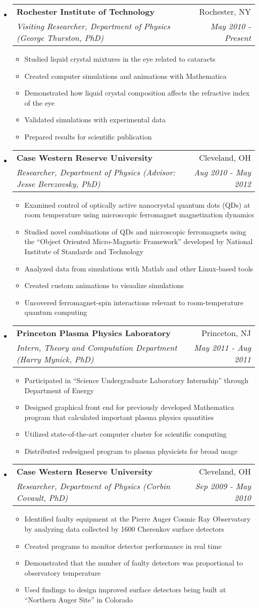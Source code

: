 \documentclass[letterpaper,11pt]{article}
\makeatletter
\newcommand{\resitem}[1]{\item #1 \vspace{-2pt}}
\newcommand{\ressubheading}[4]{\vspace{-14pt}
\begin{tabular*}{7.0in}{l@{\extracolsep{\fill}}r}
		\\
		\textbf{#1} & #2 \\
		\textit{#3} & \textit{#4} \\
\end{tabular*}\vspace{-6pt}}
\makeatother
\begin{document}
\begin{itemize}

\item
	\ressubheading{Rochester Institute of Technology}{Rochester, NY}{Visiting Researcher, Department of Physics (George Thurston, PhD)}{May 2010 - Present}
	\begin{itemize}
		\resitem{Studied liquid crystal mixtures in the eye related to cataracts}
		\resitem{Created computer simulations and animations with Mathematica}
		\resitem{Demonstrated how liquid crystal composition affects the refractive index of the eye}
	 	\resitem{Validated simulations with experimental data}
	 	\resitem{Prepared results for scientific publication}
	\end{itemize}	
	
\item
	\ressubheading{Case Western Reserve University}{Cleveland, OH}{Researcher, Department of Physics (Advisor: Jesse Berezovsky, PhD)}{Aug 2010 - May 2012}
	\begin{itemize}
		\resitem{Examined control of optically active nanocrystal quantum dots (QDs) at room temperature using microscopic ferromagnet magnetization dynamics}
		\resitem{Studied novel combinations of QDs and microscopic ferromagnets using the ``Object Oriented Micro-Magnetic Framework'' developed by National Institute of Standards and Technology}
		\resitem{Analyzed data from simulations with Matlab and other Linux-based tools}
		\resitem{Created custom animations to visualize simulations}
		\resitem{Uncovered ferromagnet-spin interactions relevant to room-temperature quantum computing}
		
	\end{itemize}

\item
	\ressubheading{Princeton Plasma Physics Laboratory}{Princeton, NJ}{Intern, Theory and Computation Department (Harry Mynick, PhD)}{May 2011 - Aug 2011}
	\begin{itemize}	
		\resitem{Participated in ``Science Undergraduate Laboratory Internship'' through Department of Energy}
		\resitem{Designed graphical front end for previously developed Mathematica program that calculated important plasma physics quantities}
		\resitem{Utilized state-of-the-art computer cluster for scientific computing}
		\resitem{Distributed redesigned program to plasma physicists for broad usage}
		
	\end{itemize}	

\item
	\ressubheading{Case Western Reserve University}{Cleveland, OH}{Researcher, Department of Physics (Corbin Covault, PhD)}{Sep 2009 - May 2010}
	\begin{itemize}
		\resitem{Identified faulty equipment at the Pierre Auger Cosmic Ray Observatory by analyzing data collected by 1600 Cherenkov surface detectors}
		\resitem{Created programs to monitor detector performance in real time} 
		\resitem{Demonstrated that the number of faulty detectors was proportional to observatory temperature} 
		\resitem{Used findings to design improved surface detectors being built at ``Northern Auger Site'' in Colorado}
	\end{itemize}


\end{itemize}
\end{document}
